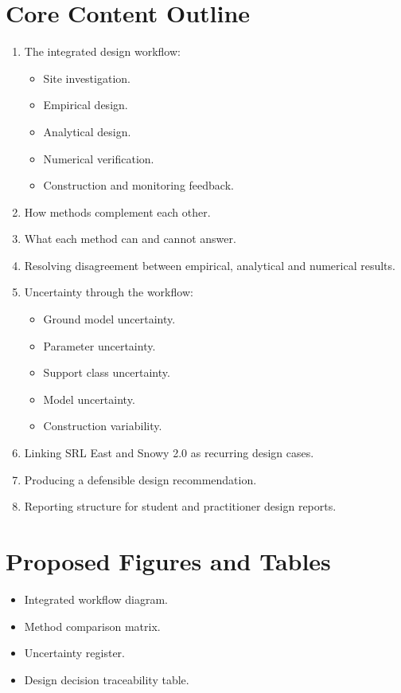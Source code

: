 \documentclass[12pt,oneside]{book}
\begin{document}
\section{Core Content Outline}
\begin{enumerate}
    \item The integrated design workflow:
    \begin{itemize}
        \item Site investigation.
        \item Empirical design.
        \item Analytical design.
        \item Numerical verification.
        \item Construction and monitoring feedback.
    \end{itemize}
    \item How methods complement each other.
    \item What each method can and cannot answer.
    \item Resolving disagreement between empirical, analytical and numerical results.
    \item Uncertainty through the workflow:
    \begin{itemize}
        \item Ground model uncertainty.
        \item Parameter uncertainty.
        \item Support class uncertainty.
        \item Model uncertainty.
        \item Construction variability.
    \end{itemize}
    \item Linking SRL East and Snowy 2.0 as recurring design cases.
    \item Producing a defensible design recommendation.
    \item Reporting structure for student and practitioner design reports.
\end{enumerate}

\section{Proposed Figures and Tables}
\begin{itemize}
    \item Integrated workflow diagram.
    \item Method comparison matrix.
    \item Uncertainty register.
    \item Design decision traceability table.
\end{itemize}
\end{document}
